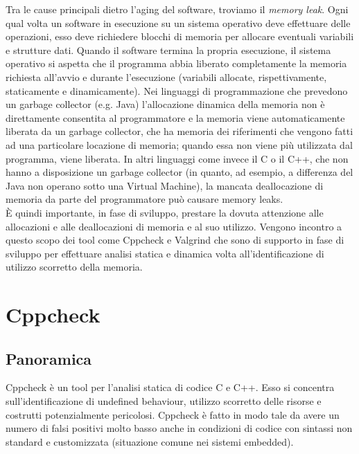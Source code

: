 \documentclass{article}
\begin{document}
Tra le cause principali dietro l'aging del software, troviamo il \emph{memory
leak}. Ogni qual volta un software in esecuzione su un sistema operativo deve
effettuare delle operazioni, esso deve richiedere blocchi di memoria per
allocare eventuali variabili e strutture dati. Quando il software termina la
propria esecuzione, il sistema operativo si aspetta che il programma abbia
liberato completamente la memoria richiesta all'avvio e durante l'esecuzione
(variabili allocate, rispettivamente, staticamente e dinamicamente). Nei
linguaggi di programmazione che prevedono un garbage collector (e.g. Java)
l'allocazione dinamica della memoria non è direttamente consentita al
programmatore e la memoria viene automaticamente liberata da un garbage
collector, che ha memoria dei riferimenti che vengono fatti ad una particolare
locazione di memoria; quando essa non viene più utilizzata dal programma, viene
liberata. In altri linguaggi come invece il C o il C++, che non hanno a
disposizione un garbage collector (in quanto, ad esempio, a differenza del Java
non operano sotto una Virtual Machine), la mancata deallocazione di memoria da
parte del programmatore può causare memory leaks. \\

È quindi importante, in fase di sviluppo, prestare la dovuta attenzione alle
allocazioni e alle deallocazioni di memoria e al suo utilizzo. Vengono incontro
a questo scopo dei tool come Cppcheck e Valgrind che sono di supporto in fase di
sviluppo per effettuare analisi statica e dinamica volta all'identificazione di
utilizzo scorretto della memoria.
 

\section{Cppcheck}

\subsection{Panoramica}
\label{sec:cppcheck:panoramica}

Cppcheck è un tool per l'analisi statica di codice C e C++. Esso si concentra
sull'identificazione di undefined behaviour, utilizzo scorretto delle risorse e
costrutti potenzialmente pericolosi. Cppcheck è fatto in modo tale da avere un
numero di falsi positivi molto basso anche in condizioni di codice con sintassi
non standard e customizzata (situazione comune nei sistemi embedded).
\end{document}
